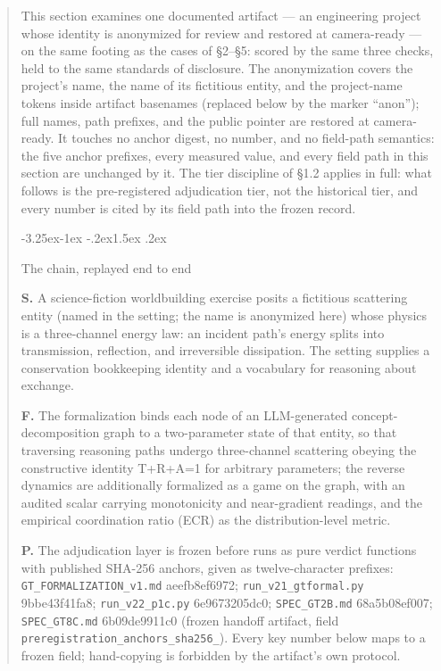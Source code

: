 \documentclass[11pt,a4paper]{article}
\makeatletter
\renewcommand\subsection{\@startsection{subsection}{2}{\z@}%
  {-3.25ex\@plus -1ex \@minus -.2ex}{1.5ex \@plus .2ex}%
  {\normalfont\large\bfseries\raggedright}}
\makeatother
\begin{document}
\begin{abstract}
This section examines one documented artifact — an engineering project whose identity is anonymized for review and restored at camera-ready — on the same footing as the cases of §2–§5: scored by the same three checks, held to the same standards of disclosure. The anonymization covers the project's name, the name of its fictitious entity, and the project-name tokens inside artifact basenames (replaced below by the marker ``anon''); full names, path prefixes, and the public pointer are restored at camera-ready. It touches no anchor digest, no number, and no field-path semantics: the five anchor prefixes, every measured value, and every field path in this section are unchanged by it. The tier discipline of §1.2 applies in full: what follows is the pre-registered adjudication tier, not the historical tier, and every number is cited by its field path into the frozen record.

\subsection{The chain, replayed end to end}

\textbf{S.} A science-fiction worldbuilding exercise posits a fictitious scattering entity (named in the setting; the name is anonymized here) whose physics is a three-channel energy law: an incident path's energy splits into transmission, reflection, and irreversible dissipation. The setting supplies a conservation bookkeeping identity and a vocabulary for reasoning about exchange.

\textbf{F.} The formalization binds each node of an LLM-generated concept-decomposition graph to a two-parameter state of that entity, so that traversing reasoning paths undergo three-channel scattering obeying the constructive identity T+R+A=1 for arbitrary parameters; the reverse dynamics are additionally formalized as a game on the graph, with an audited scalar carrying monotonicity and near-gradient readings, and the empirical coordination ratio (ECR) as the distribution-level metric.

\textbf{P.} The adjudication layer is frozen before runs as pure verdict functions with published SHA-256 anchors, given as twelve-character prefixes: \texttt{GT\_\allowbreak FORMALIZATION\_\allowbreak v1.md} aeefb8ef6972; \texttt{run\_\allowbreak v21\_\allowbreak gtformal.py} 9bbe43f41fa8; \texttt{run\_\allowbreak v22\_\allowbreak p1c.py} 6e9673205dc0; \texttt{SPEC\_\allowbreak GT2B.md} 68a5b08ef007; \texttt{SPEC\_\allowbreak GT8C.md} 6b09de9911c0 (frozen handoff artifact, field \texttt{preregistration\_\allowbreak anchors\_\allowbreak sha256\_}). Every key number below maps to a frozen field; hand-copying is forbidden by the artifact's own protocol.


\end{abstract}
\end{document}
